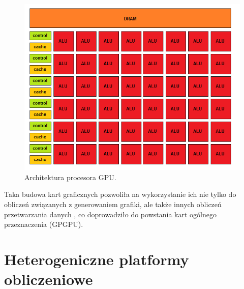 \begin{figure}[h]
        \centering
                \centering
                \includegraphics[width=12cm]{rys7}
	\caption{Architektura procesora GPU.}
\end{figure}
Taka budowa kart graficznych pozwoliła na wykorzystanie ich nie tylko do obliczeń związanych z generowaniem grafiki, ale także innych obliczeń przetwarzania danych , co doprowadziło do powstania kart ogólnego przeznaczenia (GPGPU).




\section{Heterogeniczne platformy obliczeniowe}\label{sec:hetero}

